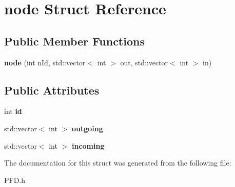 \hypertarget{structnode}{\section{node \-Struct \-Reference}
\label{structnode}
}
\subsection*{\-Public \-Member \-Functions}
\begin{DoxyCompactItemize}
\item 
\hypertarget{structnode_a00490a4fdc36be462497c852dd431fef}{{\bfseries node} (int n\-Id, std\-::vector$<$ int $>$ out, std\-::vector$<$ int $>$ in)}\label{structnode_a00490a4fdc36be462497c852dd431fef}

\end{DoxyCompactItemize}
\subsection*{\-Public \-Attributes}
\begin{DoxyCompactItemize}
\item 
\hypertarget{structnode_a8ceaa10e39f74fdfdae30c68a50074e2}{int {\bfseries id}}\label{structnode_a8ceaa10e39f74fdfdae30c68a50074e2}

\item 
\hypertarget{structnode_a37a36787896526492228121ab018327b}{std\-::vector$<$ int $>$ {\bfseries outgoing}}\label{structnode_a37a36787896526492228121ab018327b}

\item 
\hypertarget{structnode_aeca2ae08d302d32d93b183a07684d220}{std\-::vector$<$ int $>$ {\bfseries incoming}}\label{structnode_aeca2ae08d302d32d93b183a07684d220}

\end{DoxyCompactItemize}


\-The documentation for this struct was generated from the following file\-:\begin{DoxyCompactItemize}
\item 
\-P\-F\-D.\-h\end{DoxyCompactItemize}
